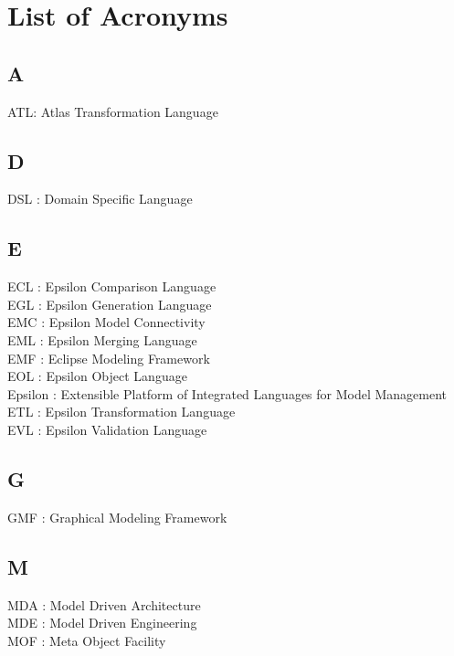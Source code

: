 \chapter{List of Acronyms}
\label{app:Acronyms}

\section*{A}

ATL: Atlas Transformation Language\\

\section*{D}

DSL : Domain Specific Language \\

\section*{E}

ECL : Epsilon Comparison Language\\
EGL : Epsilon Generation Language\\
EMC : Epsilon Model Connectivity\\
EML : Epsilon Merging Language\\
EMF : Eclipse Modeling Framework\\
EOL : Epsilon Object Language\\
Epsilon : Extensible Platform of Integrated Languages for Model Management \\
ETL : Epsilon Transformation Language\\
EVL : Epsilon Validation Language

\section*{G}

GMF : Graphical Modeling Framework

\section*{M}

MDA : Model Driven Architecture\\
MDE : Model Driven Engineering\\
MOF : Meta Object Facility\\

